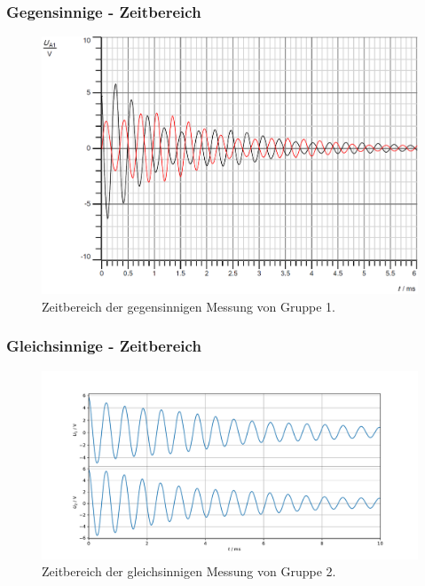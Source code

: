 \documentclass{beamer}
\begin{document}
\begin{frame}
\frametitle{Gegensinnige - Zeitbereich}
\begin{figure}
\includegraphics[width = .75\framewidth]{abbildungen/plotsLC/GegenGraph.PNG}
\caption{Zeitbereich der gegensinnigen Messung von Gruppe 1.}
\end{figure}
\end{frame}


\begin{frame}
\frametitle{Gleichsinnige - Zeitbereich}
\begin{figure}
\includegraphics[width = \framewidth]{abbildungen/plotsLC/fundamental_roh.pdf}
\caption{Zeitbereich der gleichsinnigen Messung von Gruppe 2.}
\end{figure}
\end{frame}
\end{document}
